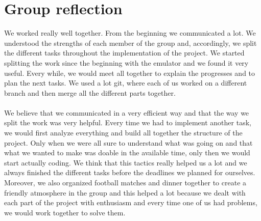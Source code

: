 \documentclass[a4paper]{article}
\begin{document}
\section{Group reflection}
We worked really well together. From the beginning we communicated a lot. We understood the strengths of each member of the group and, accordingly, we split the different tasks throughout the implementation of the project. We started splitting the work since the beginning with the emulator and we found it very useful. Every while, we would meet all together to explain the progresses and to plan the next tasks. We used a lot git, where each of us worked on a different branch and then merge all the different parts together. 
\\\\
We believe that we communicated in a very efficient way and that the way we split the work was very helpful. Every time we had to implement another task, we would first analyze everything and build all together the structure of the project. Only when we were all sure to understand what was going on and that what we wanted to make was doable in the available time, only then we would start actually coding. We think that this tactics really helped us a lot and we always finished the different tasks before the deadlines we planned for ourselves. Moreover, we also organized football matches and dinner together to create a friendly atmosphere in the group and this helped a lot because we dealt with each part of the project with enthusiasm and every time one of us had problems, we would work together to solve them.
\end{document}
